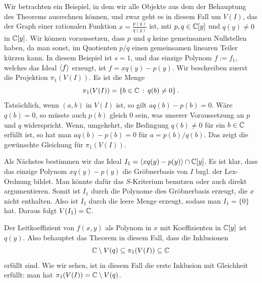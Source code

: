 \documentclass[11pt]{article}
\numberwithin{equation}{section}
\begin{document}
\begin{beispiel} 
	Wir betrachten ein Beispiel, in dem wir alle Objekte aus dem der Behauptung des Theorems ausrechnen können, und zwar geht es in diesem Fall um $V(I)$, das der Graph einer rationalen Funktion $x = \frac{p (y)}{q(y)}$ ist, mti $p,q \in \mathbb{C}[y]$ und $q(y) \ne 0$ in $\mathbb{C}[y]$. Wir können voraussetzen, dass $p$ und $q$ keine gemeinsamen Nullstellen haben, da man sonst, im Quotienten $p/q$ einen gemeinsamen linearen Teiler kürzen kann. In diesem Beispiel ist $s=1$, und das einzige Polynom $f:= f_1$, welches das Ideal $\left< f \right>$ erzeugt, ist $f = x q(y) - p(y)$. Wir beschreiben zuerst die Projektion $\pi_1(V(I))$. Es ist die Menge 
	\[
		\pi_1(V(I)) = \left\{  b \in \mathbb{C} \,:\,  q(b) \ne 0 \right\}. 
	\]
	Tatsächlich, wenn $(a,b)$ in $V(I)$ ist, so gilt $a q(b) - p(b) = 0$. Wäre $q(b) =0$, so müsste auch $p(b)$ gleich $0$ sein, was unserer Voraussetzung an $p$ und $q$ widerspricht. Wenn, umgekehrt, die Bedingung $q(b) \ne 0$ für ein $b \in \mathbb{C}$ erfüllt ist, so hat man $a q(b) - p(b) = 0$ für $a = p(b)/q(b)$. Das zeigt die gewünschte Gleichung für $\pi_1(V(I))$. 
	
	
	Als Nächstes bestimmen wir das Ideal $I_1 = \left< x q(y) - p(y)  \right> \cap \mathbb{C}[y]$. Es ist klar, dass das einzige Polynom $x q(y) - p(y)$ die Gröbnerbasis von $I$ bzgl. der Lex-Ordnung bildet. Man könnte dafür das $S$-Kriterium benutzen oder auch direkt argumentieren. Somit ist $I_1$ durch die Polynome dies  Gröbnerbasis erzeugt, die $x$ nicht enthalten. Also ist $I_1$ durch die leere Menge erzeugt, sodass man $I_1 = \{0\}$ hat. Daraus folgt $V(I_1) = \mathbb{C}$. 

	Der Leitkoeffizient von $f(x,y)$ als Polynom in $x$ mit Koeffizienten in $\mathbb{C}[y]$ ist $q(y)$. Also behauptet das Theorem in diesem Fall, dass die Inklusionen 
	\[
		\mathbb{C} \setminus V(q) \subseteq \pi_1(V(I)) \subseteq \mathbb{C}
	\]
	erfüllt sind. Wie wir sehen, ist in diesem Fall die erste Inklusion mit Gleichheit erfüllt: man hat $\pi_1(V(I)) = \mathbb{C} \setminus V(q)$. 
\end{beispiel} 
\end{document}
